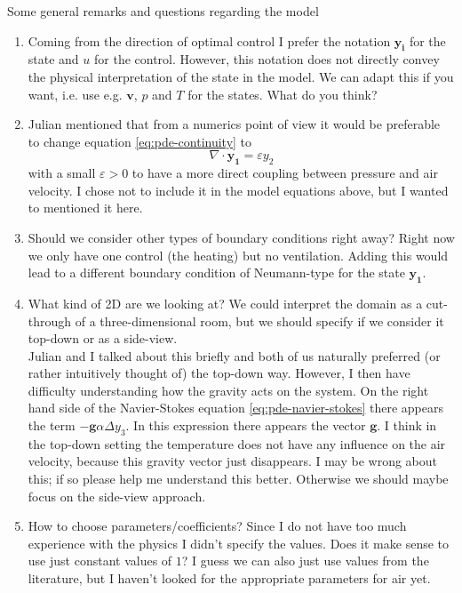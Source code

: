 \documentclass[
12pt,
a4paper,
onecolumn,
portrait
]{article}
\begin{document}
\begin{rem}
Some general remarks and questions regarding the model
\begin{enumerate}
\item Coming from the direction of optimal control I prefer the notation $\mathbf{y_i}$ for the state and $u$ for the control. However, this notation does not directly convey the physical interpretation of the state in the model. We can adapt this if you want, i.e. use e.g. $\mathbf{v}$, $p$ and $T$ for the states. What do you think?
\item 
Julian mentioned that from a numerics point of view it would be preferable to change equation \eqref{eq:pde-continuity} to
\begin{equation}
\nabla \cdot \mathbf{y_1} = \varepsilon y_2
\end{equation}
with a small $\varepsilon > 0$ to have a more direct coupling between pressure and air velocity. I chose not to include it in the model equations above, but I wanted to mentioned it here.
\item Should we consider other types of boundary conditions right away? Right now we only have one control (the heating) but no ventilation. Adding this would lead to a different boundary condition of Neumann-type for the state $\mathbf{y_1}$.
\item What kind of 2D are we looking at? We could interpret the domain as a cut-through of a three-dimensional room, but we should specify if we consider it top-down or as a side-view.\\
Julian and I talked about this briefly and both of us naturally preferred (or rather intuitively thought of) the top-down way. However, I then have difficulty understanding how the gravity acts on the system.  On the right hand side of the Navier-Stokes equation \eqref{eq:pde-navier-stokes} there appears the term $- \textbf{g} \alpha \Delta y_3$. In this expression there appears the vector $\mathbf{g}$. I think in the top-down setting the temperature does not have any influence on the air velocity, because this gravity vector just disappears. I may be wrong about this; if so please help me understand this better. Otherwise we should maybe focus on the side-view approach.
\item How to choose parameters/coefficients? Since I do not have too much experience with the physics I didn't specify the values. Does it make sense to use just constant values of $1$? I guess we can also just use values from the literature, but I haven't looked for the appropriate parameters for air yet.
\end{enumerate}
\end{rem}
\end{document}
